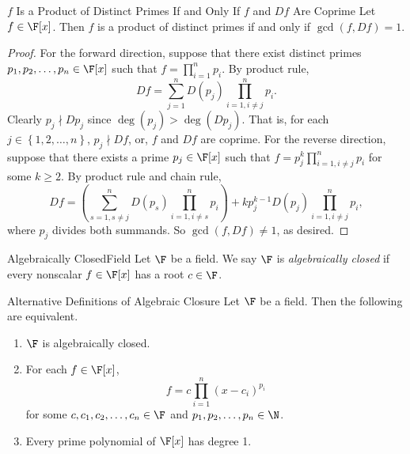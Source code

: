 \documentclass[linearalgebraII]{subfiles}
\begin{document}
    \clearpage
    \begin{prop}{$f$ Is a Product of Distinct Primes If and Only If $f$ and $Df$ Are Coprime}
        Let $f\in \F[x]$. Then $f$ is a product of distinct primes if and only if $\gcd(f, Df) = 1$.
    \end{prop}

    \begin{proof}
        For the forward direction, suppose that there exist distinct primes $p_1, p_2, \ldots, p_n\in \F[x]$ such that $f = \prod^{n}_{i=1} p_i$. By product rule,
        \begin{equation*}
            Df = \sum^{n}_{j=1} D(p_j) \prod^{n}_{i=1, i\neq j} p_i. 
        \end{equation*}
        Clearly $p_j\nmid Dp_j$ since $\deg(p_j) > \deg(Dp_j)$. That is, for each $j\in \left\lbrace 1, 2, \ldots, n \right\rbrace$, $p_j\nmid Df$, or, $f$ and $Df$ are coprime. For the reverse direction, suppose that there exists a prime $p_j\in \F[x]$ such that $f = p_j^k \prod^{n}_{i=1, i\neq j} p_i$ for some $k\geq 2$. By product rule and chain rule,
        \begin{equation*}
            Df = \left( \sum^{n}_{s=1, s\neq j} D(p_s) \prod^{n}_{i=1, i\neq s} p_i  \right) + kp_j^{k-1} D(p_j) \prod^{n}_{i=1, i\neq j} p_i, 
        \end{equation*}
        where $p_j$ divides both summands. So $\gcd(f, Df)\neq 1$, as desired.
    \end{proof}

    \begin{definition}{Algebraically Closed}{Field}
        Let $\F$ be a field. We say $\F$ is \emph{algebraically closed} if every nonscalar $f\in \F[x]$ has a root $c\in \F$.
    \end{definition}

    \begin{prop}{Alternative Definitions of Algebraic Closure}
        Let $\F$ be a field. Then the following are equivalent.
        \begin{enumerate}
            \item $\F$ is algebraically closed.
            \item For each $f\in \F[x]$, 
                \begin{equation*}
                    f = c\prod^{n}_{i=1} \left( x-c_i \right) ^{p_i}
                \end{equation*}
                for some $c, c_1, c_2, \ldots, c_n\in \F$ and $p_1, p_2, \ldots, p_n\in \N$.
            \item Every prime polynomial of $\F[x]$ has degree 1.
        \end{enumerate}
    \end{prop}
\end{document}
